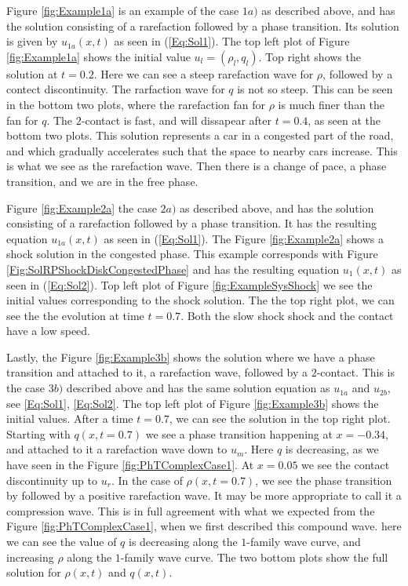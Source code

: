 \documentclass[10pt]{article}
\numberwithin{equation}{section}
\begin{document}
Figure \ref{fig:Example1a} is an example of the case $1a)$ as described above, and has the solution consisting of a rarefaction followed by a phase transition. Its solution is given by $u_{1a}(x,t)$ as seen in (\ref{Eq:Sol1}). The top left plot of Figure \ref{fig:Example1a} shows the initial value $u_l = (\rho_l, q_l)$. Top right shows the solution at $t = 0.2$. Here we can see a steep rarefaction wave for $\rho$, followed by a contect discontinuity. The rarfaction wave for $q$ is not so steep. This can be seen in the bottom two plots, where the rarefaction fan for $\rho$ is much finer than the fan for $q$.  The $2$-contact is fast, and will dissapear after $t=0.4$, as seen at the bottom two plots. This solution represents a car in a congested part of the road, and which gradually accelerates such that the space to nearby cars increase. This is what we see as the rarefaction wave. Then there is a change of pace, a phase transition, and we are in the free phase. 

Figure \ref{fig:Example2a} the case $2a)$ as described above, and has the solution consisting of a rarefaction followed by a phase transition. It has the resulting equation $u_{1a}(x,t)$ as seen in (\ref{Eq:Sol1}).
The Figure \ref{fig:Example2a} shows a shock solution in the congested phase. This example corresponds with Figure \ref{Fig:SolRPShockDiskCongestedPhase} and has the resulting equation $u_1(x,t)$ as seen in (\ref{Eq:Sol2}). Top left plot of Figure \ref{fig:ExampleSysShock} we see the initial values corresponding to the shock solution. The the top right plot, we can see the the evolution at time $t = 0.7$. Both the slow shock shock and the contact have a low speed.

Lastly, the Figure \ref{fig:Example3b} shows the solution where we have a phase transition and attached to it, a rarefaction wave, followed by a $2$-contact. This is the case $3b)$ described above and has the same solution equation as $u_{1a}$ and $u_{2b}$, see \ref{Eq:Sol1}, \ref{Eq:Sol2}. The top left plot of Figure \ref{fig:Example3b} shows the initial values. After a time $t = 0.7$, we can see the solution in the top right plot. Starting with $q(x, t = 0.7)$ we see a phase transition happening at $x = -0.34$, and attached to it a rarefaction wave down to $u_m$. Here $q$ is decreasing, as we have seen in the Figure \ref{fig:PhTComplexCase1}. At $x = 0.05$ we see the contact discontinuity up to $u_r$. In the case of $\rho(x, t = 0.7)$, we see the phase transition by followed by a positive rarefaction wave. It may be more appropriate to call it a compression wave. This is in full agreement with what we expected from the Figure \ref{fig:PhTComplexCase1}, when we first described this compound wave. here we can see the value of $q$ is decreasing along the $1$-family wave curve, and increasing $\rho$ along the $1$-family wave curve. The two bottom plots show the full solution for $\rho(x,t)$ and $q(x,t)$.
\end{document}
